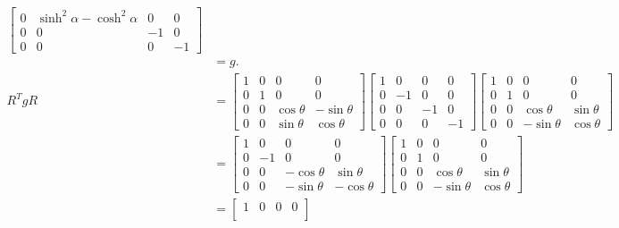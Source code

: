 \documentclass{article}
\begin{document}
\begin{enumerate}[label=(\alph*)]
\begin{align*}
\begin{bmatrix}
                0 & \sinh^2 \alpha - \cosh^2 \alpha & 0 & 0 \\
                0 & 0 & -1 & 0 \\
                0 & 0 & 0 & -1
            \end{bmatrix} \\
            &= g. \\
            R^T g R &= \begin{bmatrix}
                1 & 0 & 0 & 0 \\
                0 & 1 & 0 & 0 \\
                0 & 0 & \cos \theta & -\sin \theta \\
                0 & 0 & \sin \theta & \cos \theta
            \end{bmatrix} \begin{bmatrix}
                1 & 0 & 0 & 0 \\
                0 & -1 & 0 & 0 \\
                0 & 0 & -1 & 0 \\
                0 & 0 & 0 & -1
            \end{bmatrix} \begin{bmatrix}
                1 & 0 & 0 & 0 \\
                0 & 1 & 0 & 0 \\
                0 & 0 & \cos \theta & \sin \theta \\
                0 & 0 & -\sin \theta & \cos \theta
            \end{bmatrix} \\
            &= \begin{bmatrix}
                1 & 0 & 0 & 0 \\
                0 & -1 & 0 & 0 \\
                0 & 0 & -\cos \theta & \sin \theta \\
                0 & 0 & -\sin \theta & -\cos \theta
            \end{bmatrix} \begin{bmatrix}
                1 & 0 & 0 & 0 \\
                0 & 1 & 0 & 0 \\
                0 & 0 & \cos \theta & \sin \theta \\
                0 & 0 & -\sin \theta & \cos \theta
            \end{bmatrix} \\
            &= \begin{bmatrix}
                1 & 0 & 0 & 0 \\

\end{bmatrix}
\end{align*}
\end{enumerate}
\end{document}
